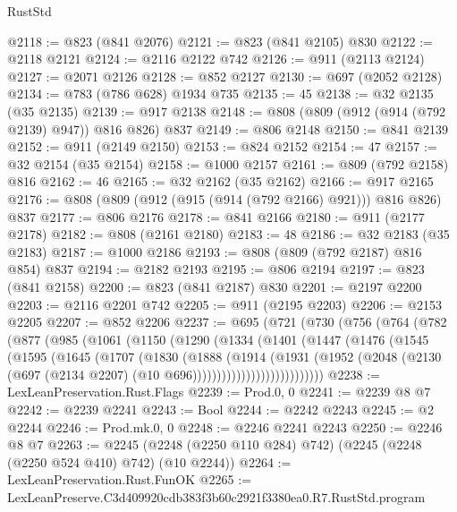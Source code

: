 \begin{lexlean}{RustStd}
\begin{coremodule}
@2118 := @823 (@841 @2076)
@2121 := @823 (@841 @2105) @830
@2122 := @2118 @2121
@2124 := @2116 @2122 @742
@2126 := @911 (@2113 @2124)
@2127 := @2071 @2126
@2128 := @852 @2127
@2130 := @697 (@2052 @2128)
@2134 := @783 (@786 @628) @1934 @735
@2135 := 45
@2138 := @32 @2135 (@35 @2135)
@2139 := @917 @2138
@2148 := @808 (@809 (@912 (@914 (@792 @2139) @947)) @816 @826) @837
@2149 := @806 @2148
@2150 := @841 @2139
@2152 := @911 (@2149 @2150)
@2153 := @824 @2152
@2154 := 47
@2157 := @32 @2154 (@35 @2154)
@2158 := @1000 @2157
@2161 := @809 (@792 @2158) @816
@2162 := 46
@2165 := @32 @2162 (@35 @2162)
@2166 := @917 @2165
@2176 := @808 (@809 (@912 (@915 (@914 (@792 @2166) @921))) @816 @826) @837
@2177 := @806 @2176
@2178 := @841 @2166
@2180 := @911 (@2177 @2178)
@2182 := @808 (@2161 @2180)
@2183 := 48
@2186 := @32 @2183 (@35 @2183)
@2187 := @1000 @2186
@2193 := @808 (@809 (@792 @2187) @816 @854) @837
@2194 := @2182 @2193
@2195 := @806 @2194
@2197 := @823 (@841 @2158)
@2200 := @823 (@841 @2187) @830
@2201 := @2197 @2200
@2203 := @2116 @2201 @742
@2205 := @911 (@2195 @2203)
@2206 := @2153 @2205
@2207 := @852 @2206
@2237 := @695
    (@721
      (@730
        (@756
          (@764
            (@782
              (@877
                (@985
                  (@1061
                    (@1150
                      (@1290
                        (@1334
                          (@1401
                            (@1447
                              (@1476
                                (@1545
                                  (@1595
                                    (@1645
                                      (@1707
                                        (@1830
                                          (@1888
                                            (@1914
                                              (@1931
                                                (@1952
                                                  (@2048
                                                    (@2130
                                                      (@697
                                                        (@2134 @2207)
                                                        (@10 @696)))))))))))))))))))))))))))
@2238 := LexLeanPreservation.Rust.Flags
@2239 := Prod.{0, 0}
@2241 := @2239 @8 @7
@2242 := @2239 @2241
@2243 := Bool
@2244 := @2242 @2243
@2245 := @2 @2244
@2246 := Prod.mk.{0, 0}
@2248 := @2246 @2241 @2243
@2250 := @2246 @8 @7
@2263 := @2245 (@2248 (@2250 @110 @284) @742) (@2245 (@2248 (@2250 @524 @410) @742) (@10 @2244))
@2264 := LexLeanPreservation.Rust.FunOK
@2265 := LexLeanPreserve.C3d409920cdb383f3b60c2921f3380ea0.R7.RustStd.program

\end{coremodule}
\end{lexlean}
